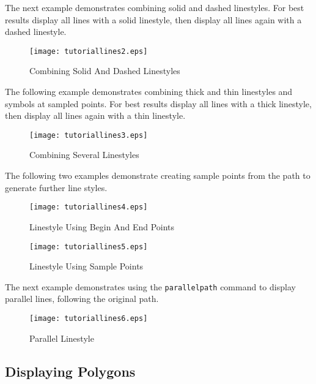 The next example demonstrates
combining solid and dashed linestyles.
For best results display all lines with a solid linestyle,
then display all lines again with a dashed linestyle.



\begin{figure}[htb]
\texttt{[image: tutoriallines2.eps]}
\caption{Combining Solid And Dashed Linestyles}
\label{tutoriallines2}
\end{figure}

The following example demonstrates combining thick and
thin linestyles and symbols at sampled points.
For best results display all lines with a thick linestyle,
then display all lines again with a thin linestyle.



\begin{figure}[htb]
\texttt{[image: tutoriallines3.eps]}
\caption{Combining Several Linestyles}
\label{tutoriallines3}
\end{figure}

The following two examples demonstrate creating sample points
from the path to generate further line styles.



\begin{figure}[htb]
\texttt{[image: tutoriallines4.eps]}
\caption{Linestyle Using Begin And End Points}
\label{tutoriallines4}
\end{figure}



\begin{figure}[htb]
\texttt{[image: tutoriallines5.eps]}
\caption{Linestyle Using Sample Points}
\label{tutoriallines5}
\end{figure}

The next example demonstrates using the \texttt{parallelpath}
command to display parallel lines, following the original path.



\begin{figure}[htb]
\texttt{[image: tutoriallines6.eps]}
\caption{Parallel Linestyle}
\label{tutoriallines6}
\end{figure}

\subsection{Displaying Polygons}

